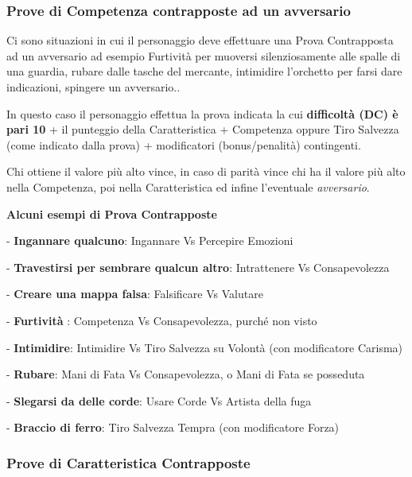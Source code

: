 \begin{multicols}{2}
\subsubsection{Prove di Competenza contrapposte ad un avversario}

Ci sono situazioni in cui il personaggio deve effettuare una Prova Contrapposta ad un avversario ad esempio Furtività per muoversi silenziosamente alle spalle di una guardia, rubare dalle tasche del mercante, intimidire l'orchetto per farsi dare indicazioni, spingere un avversario..

In questo caso il personaggio effettua la prova indicata la cui \textbf{difficoltà (DC) è pari 10} + il punteggio della Caratteristica + Competenza oppure Tiro Salvezza (come indicato dalla prova) + modificatori (bonus/penalità) contingenti.

Chi ottiene il valore più alto vince, in caso di parità vince chi ha il valore più alto nella Competenza, poi nella Caratteristica ed infine l'eventuale \emph{avversario}. 

\medskip

\textbf{Alcuni esempi di Prova Contrapposte}

\begin{description}[noitemsep, topsep=0pt, parsep=0pt, partopsep=0pt, leftmargin=0cm]
\item - \textbf{Ingannare qualcuno}: Ingannare Vs Percepire Emozioni
\item - \textbf{Travestirsi per sembrare qualcun altro}: Intrattenere Vs Consapevolezza
\item - \textbf{Creare una mappa falsa}: Falsificare Vs Valutare
\item - \textbf{Furtività} : Competenza Vs Consapevolezza, purché non visto
\item - \textbf{Intimidire}: Intimidire Vs Tiro Salvezza su Volontà (con modificatore Carisma)
\item - \textbf{Rubare}: Mani di Fata Vs Consapevolezza, o Mani di Fata se posseduta
\item - \textbf{Slegarsi da delle corde}: Usare Corde Vs Artista della fuga
\item - \textbf{Braccio di ferro}: Tiro Salvezza Tempra (con modificatore Forza)
\end{description}

\subsubsection{Prove di Caratteristica Contrapposte}


\end{multicols}
